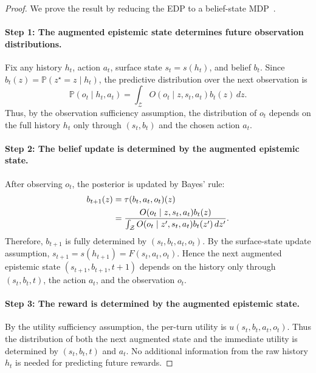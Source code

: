 \documentclass[11pt]{article}
\theoremstyle{plain}
\theoremstyle{definition}
\theoremstyle{remark}
\begin{document}
\begin{proof}
We prove the result by reducing the EDP to a belief-state MDP~\citep{aastrom1965optimal, smallwood1973optimal}.

\paragraph{Step 1: The augmented epistemic state determines future observation distributions.}
Fix any history \(h_t\), action \(a_t\), surface state \(s_t=s(h_t)\), and belief \(b_t\). Since \(b_t(z)=\mathbb{P}(z^\star=z\mid h_t)\), the predictive distribution over the next observation is
\[
    \mathbb{P}(o_t\mid h_t,a_t)
    =
    \int_{\mathcal{Z}}
    O(o_t\mid z,s_t,a_t)b_t(z)\,dz.
\]
Thus, by the observation sufficiency assumption, the distribution of \(o_t\) depends on the full history \(h_t\) only through \((s_t,b_t)\) and the chosen action \(a_t\).

\paragraph{Step 2: The belief update is determined by the augmented epistemic state.}
After observing \(o_t\), the posterior is updated by Bayes' rule:
\begin{align}
    b_{t+1}(z)
    &\notag=
    \tau(b_t,a_t,o_t)(z)\\
    &\notag=
    \frac{O(o_t\mid z,s_t,a_t)b_t(z)}
    {\int_{\mathcal{Z}}O(o_t\mid z',s_t,a_t)b_t(z')\,dz'}.
\end{align}
Therefore, \(b_{t+1}\) is fully determined by \((s_t,b_t,a_t,o_t)\). By the surface-state update assumption, \(s_{t+1}=s(h_{t+1})=F(s_t,a_t,o_t)\). Hence the next augmented epistemic state \((s_{t+1},b_{t+1},t+1)\) depends on the history only through \((s_t,b_t,t)\), the action \(a_t\), and the observation \(o_t\).

\paragraph{Step 3: The reward is determined by the augmented epistemic state.}
By the utility sufficiency assumption, the per-turn utility is \(u(s_t,b_t,a_t,o_t)\). Thus the distribution of both the next augmented state and the immediate utility is determined by \((s_t,b_t,t)\) and \(a_t\). No additional information from the raw history \(h_t\) is needed for predicting future rewards.


\end{proof}
\end{document}
